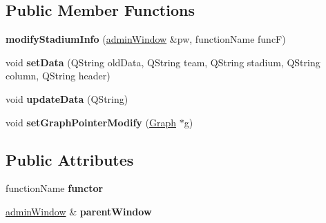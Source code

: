 \subsection*{Public Member Functions}
\begin{DoxyCompactItemize}
\item 
\mbox{\label{classmodify_stadium_info_a28e8ff87dc2589700da092d7d0b5a5e9}} 
{\bfseries modify\+Stadium\+Info} (\hyperlink{classadmin_window}{admin\+Window} \&pw, function\+Name funcF)
\item 
\mbox{\label{classmodify_stadium_info_a47d51d5e2efd12621222cba246b54181}} 
void {\bfseries set\+Data} (Q\+String old\+Data, Q\+String team, Q\+String stadium, Q\+String column, Q\+String header)
\item 
\mbox{\label{classmodify_stadium_info_a361c1b7b1b10d30de434c8dd2e2570b5}} 
void {\bfseries update\+Data} (Q\+String)
\item 
\mbox{\label{classmodify_stadium_info_a93aecdd05414df698c4998ed6baa16d1}} 
void {\bfseries set\+Graph\+Pointer\+Modify} (\hyperlink{class_graph}{Graph} $\ast$g)
\end{DoxyCompactItemize}
\subsection*{Public Attributes}
\begin{DoxyCompactItemize}
\item 
\mbox{\label{classmodify_stadium_info_ab32435bf01e518d616cff085b9de5831}} 
function\+Name {\bfseries functor}
\item 
\mbox{\label{classmodify_stadium_info_a8aeef91cabb8db2b4b3810cd0aaa14a4}} 
\hyperlink{classadmin_window}{admin\+Window} \& {\bfseries parent\+Window}
\end{DoxyCompactItemize}
